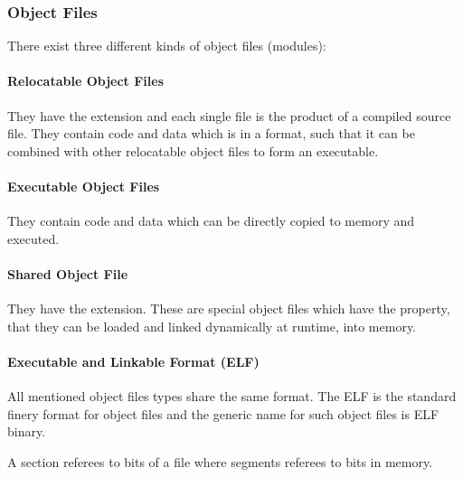 \subsubsection{Object Files}
There exist three different kinds of object files (modules):
\paragraph{Relocatable Object Files}
They have the extension  and each single file is the product of a compiled source file. They contain code and data which is in a format, such that it can be combined with other relocatable object files to form an executable. 

\paragraph{Executable Object Files}
They contain code and data which can be directly copied to memory and executed.

\paragraph{Shared Object File}
They have the  extension. These are special object files which have the property, that they can be loaded and linked dynamically at runtime, into memory.

\paragraph{Executable and Linkable Format (ELF)}
All mentioned object files types share the same format. The ELF is the standard finery format for object files and the generic name for such object files is ELF binary.

A section referees to bits of a file where segments referees to bits in memory.

